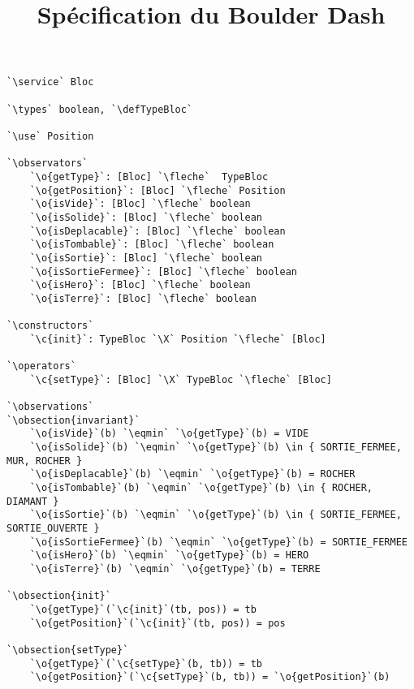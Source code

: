 \documentclass{article}
\title{Spécification du Boulder Dash}
\author{}
\date{}
\newcommand{\fleche}{$\rightarrow{}$}
\newcommand{\X}{$\times{}$}
\newcommand{\eqmin}{$\overset{min}{=}$}
\newcommand{\specsec}[1]{\normalfont{\large{\textbf{#1:}}}}
\newcommand{\service}{\specsec {Service}}
\newcommand{\types}{\specsec {Types}}
\newcommand{\use}{\specsec {Use}}
\newcommand{\observators}{\specsec {Observators}}
\newcommand{\constructors}{\specsec {Constructors}}
\newcommand{\operators}{\specsec {Operators}}
\newcommand{\observations}{\specsec {Observations}}
\newcommand{\obsection}[1]{\textbf{[#1]}}
\newcommand{\TypeBloc}{TypeBloc}
\newcommand{\defTypeBloc}{\mbox{enum \TypeBloc}~\{~VIDE, TERRE, MUR, HERO, SORTIE\_FERMEE, SORTIE\_OUVERTE, ROCHER, DIAMANT~\}}
\renewcommand{\o}[1]{\textcolor{blue}{#1}}
\renewcommand{\c}[1]{\textcolor{red}{#1}}
\begin{document}
\begin{lstlisting}[caption=Bloc]
`\service` Bloc

`\types` boolean, `\defTypeBloc`

`\use` Position

`\observators`
	`\o{getType}`: [Bloc] `\fleche`  TypeBloc
	`\o{getPosition}`: [Bloc] `\fleche` Position
	`\o{isVide}`: [Bloc] `\fleche` boolean
	`\o{isSolide}`: [Bloc] `\fleche` boolean
	`\o{isDeplacable}`: [Bloc] `\fleche` boolean
	`\o{isTombable}`: [Bloc] `\fleche` boolean
	`\o{isSortie}`: [Bloc] `\fleche` boolean
	`\o{isSortieFermee}`: [Bloc] `\fleche` boolean
	`\o{isHero}`: [Bloc] `\fleche` boolean
	`\o{isTerre}`: [Bloc] `\fleche` boolean
	
`\constructors`
	`\c{init}`: TypeBloc `\X` Position `\fleche` [Bloc]
	
`\operators`
	`\c{setType}`: [Bloc] `\X` TypeBloc `\fleche` [Bloc]
	
`\observations`
`\obsection{invariant}`
	`\o{isVide}`(b) `\eqmin` `\o{getType}`(b) = VIDE
	`\o{isSolide}`(b) `\eqmin` `\o{getType}`(b) \in { SORTIE_FERMEE, MUR, ROCHER }
	`\o{isDeplacable}`(b) `\eqmin` `\o{getType}`(b) = ROCHER
	`\o{isTombable}`(b) `\eqmin` `\o{getType}`(b) \in { ROCHER, DIAMANT }
	`\o{isSortie}`(b) `\eqmin` `\o{getType}`(b) \in { SORTIE_FERMEE, SORTIE_OUVERTE }
	`\o{isSortieFermee}`(b) `\eqmin` `\o{getType}`(b) = SORTIE_FERMEE
	`\o{isHero}`(b) `\eqmin` `\o{getType}`(b) = HERO
	`\o{isTerre}`(b) `\eqmin` `\o{getType}`(b) = TERRE
	
`\obsection{init}`
	`\o{getType}`(`\c{init}`(tb, pos)) = tb
	`\o{getPosition}`(`\c{init}`(tb, pos)) = pos

`\obsection{setType}`
	`\o{getType}`(`\c{setType}`(b, tb)) = tb
	`\o{getPosition}`(`\c{setType}`(b, tb)) = `\o{getPosition}`(b)
\end{lstlisting}
	
\clearpage{}
\end{document}
